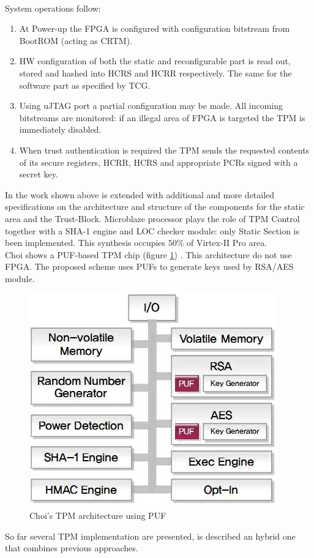 \documentclass[../tesi.tex]{subfiles}
\begin{document}
{\\ System operations follow:
\begin{enumerate}
\item At Power-up the FPGA is configured with configuration bitstream from BootROM (acting as CRTM).
\item HW configuration of both the static and reconfigurable part is read out, stored and hashed into HCRS and HCRR respectively. The same for the software part as specified by TCG. 
\item Using uJTAG port a partial configuration may be made.  All incoming bitstreams are monitored: if an illegal area of FPGA is targeted the TPM is immediately disabled. 
\item When trust authentication is required the TPM sends the requested contents of its secure registers, HCRR, HCRS and appropriate PCRs signed with a secret key. 
\end{enumerate}
In \cite{glas2009configuration} the work shown above is extended with additional and more detailed specifications on the architecture and structure of the components for the static area and the Trust-Block. Microblaze processor plays the role of TPM Control together with a SHA-1 engine and LOC checker module: only Static Section is been implemented. This synthesis occupies $50\%$ of Virtex-II Pro area.\\
Choi shows a PUF-based TPM  chip \cite{choi2012design} (figure \ref{fig:choiproposal}) . This architecture do not use FPGA. The proposed scheme uses PUFs to generate keys used by RSA/AES module. 
\begin{figure}
\centering
\includegraphics[scale=0.40]{images/choiarchitecture.png}
\caption{Choi's TPM architecture using PUF}
\label{fig:choiproposal}
\end{figure}
So far several TPM implementation are presented, \cite{glas2009configuration} is described an hybrid one that combines previous approaches.

}
\end{document}
